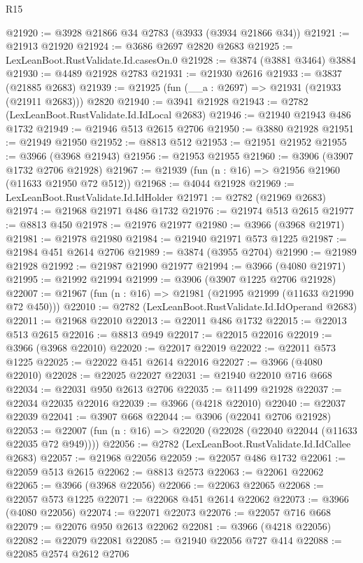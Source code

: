 \begin{lexlean}{R15}
\begin{coremodule}
@21920 := @3928 @21866 @34 @2783 (@3933 (@3934 @21866 @34))
@21921 := @21913 @21920
@21924 := @3686 @2697 @2820 @2683
@21925 := LexLeanBoot.RustValidate.Id.casesOn.{0}
@21928 := @3874 (@3881 @3464) @3884
@21930 := @4489 @21928 @2783
@21931 := @21930 @2616
@21933 := @3837 (@21885 @2683)
@21939 := @21925 (fun (__a : @2697) => @21931 (@21933 (@21911 @2683))) @2820
@21940 := @3941 @21928
@21943 := @2782 (LexLeanBoot.RustValidate.Id.IdLocal @2683)
@21946 := @21940 @21943 @486 @1732
@21949 := @21946 @513 @2615 @2706
@21950 := @3880 @21928
@21951 := @21949 @21950
@21952 := @8813 @512
@21953 := @21951 @21952
@21955 := @3966 (@3968 @21943)
@21956 := @21953 @21955
@21960 := @3906 (@3907 @1732 @2706 @21928)
@21967 := @21939 (fun (n : @16) => @21956 @21960 (@11633 @21950 @72 @512))
@21968 := @4044 @21928
@21969 := LexLeanBoot.RustValidate.Id.IdHolder
@21971 := @2782 (@21969 @2683)
@21974 := @21968 @21971 @486 @1732
@21976 := @21974 @513 @2615
@21977 := @8813 @450
@21978 := @21976 @21977
@21980 := @3966 (@3968 @21971)
@21981 := @21978 @21980
@21984 := @21940 @21971 @573 @1225
@21987 := @21984 @451 @2614 @2706
@21989 := @3874 (@3955 @2704)
@21990 := @21989 @21928
@21992 := @21987 @21990 @21977
@21994 := @3966 (@4080 @21971)
@21995 := @21992 @21994
@21999 := @3906 (@3907 @1225 @2706 @21928)
@22007 := @21967 (fun (n : @16) => @21981 (@21995 @21999 (@11633 @21990 @72 @450)))
@22010 := @2782 (LexLeanBoot.RustValidate.Id.IdOperand @2683)
@22011 := @21968 @22010
@22013 := @22011 @486 @1732
@22015 := @22013 @513 @2615
@22016 := @8813 @949
@22017 := @22015 @22016
@22019 := @3966 (@3968 @22010)
@22020 := @22017 @22019
@22022 := @22011 @573 @1225
@22025 := @22022 @451 @2614 @22016
@22027 := @3966 (@4080 @22010)
@22028 := @22025 @22027
@22031 := @21940 @22010 @716 @668
@22034 := @22031 @950 @2613 @2706
@22035 := @11499 @21928
@22037 := @22034 @22035 @22016
@22039 := @3966 (@4218 @22010)
@22040 := @22037 @22039
@22041 := @3907 @668
@22044 := @3906 (@22041 @2706 @21928)
@22053 := @22007 (fun (n : @16) => @22020 (@22028 (@22040 @22044 (@11633 @22035 @72 @949))))
@22056 := @2782 (LexLeanBoot.RustValidate.Id.IdCallee @2683)
@22057 := @21968 @22056
@22059 := @22057 @486 @1732
@22061 := @22059 @513 @2615
@22062 := @8813 @2573
@22063 := @22061 @22062
@22065 := @3966 (@3968 @22056)
@22066 := @22063 @22065
@22068 := @22057 @573 @1225
@22071 := @22068 @451 @2614 @22062
@22073 := @3966 (@4080 @22056)
@22074 := @22071 @22073
@22076 := @22057 @716 @668
@22079 := @22076 @950 @2613 @22062
@22081 := @3966 (@4218 @22056)
@22082 := @22079 @22081
@22085 := @21940 @22056 @727 @414
@22088 := @22085 @2574 @2612 @2706

\end{coremodule}
\end{lexlean}
